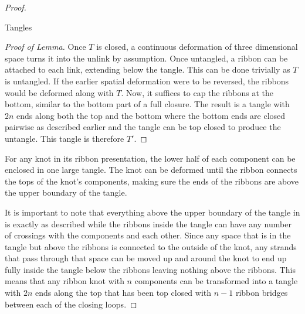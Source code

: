 \begin{paper}
\begin{proof}
\begin{paperlemma}{Tangles}
\end{paperlemma}
\begin{proof}[Proof of Lemma]
Once $T$ is closed, a continuous deformation of three dimensional space turns it
into the unlink by assumption.
Once untangled, a ribbon can be attached to each link, extending below the
tangle.
This can be done trivially as $T$ is untangled.
If the earlier spatial deformation were to be reversed, the ribbons would be
deformed along with $T$.
Now, it suffices to cap the ribbons at the bottom, similar to the bottom part of
a full closure.
The result is a tangle with $2n$ ends along both the top and the bottom where
the bottom ends are closed pairwise as described earlier and the tangle can be
top closed to produce the untangle.
This tangle is therefore $T'$.
\end{proof}
For any knot in its ribbon presentation, the lower half of each component can be
enclosed in one large tangle.
The knot can be deformed until the ribbon connects the tops of the knot's
components, making sure the ends of the ribbons are above the upper boundary of
the tangle.


It is important to note that everything above the upper boundary of the tangle
in \figLowered is exactly as described while the ribbons inside the tangle can
have any number of crossings with the components and each other.
Since any space that is in the tangle but above the ribbons is connected to the
outside of the knot, any strands that pass through that space can be moved up
and around the knot to end up fully inside the tangle below the ribbons leaving
nothing above the ribbons.
This means that any ribbon knot with $n$ components can be transformed into a
tangle with $2n$ ends along the top that has been top closed with $n-1$ ribbon
bridges between each of the closing loops.


\end{proof}
\end{paper}
